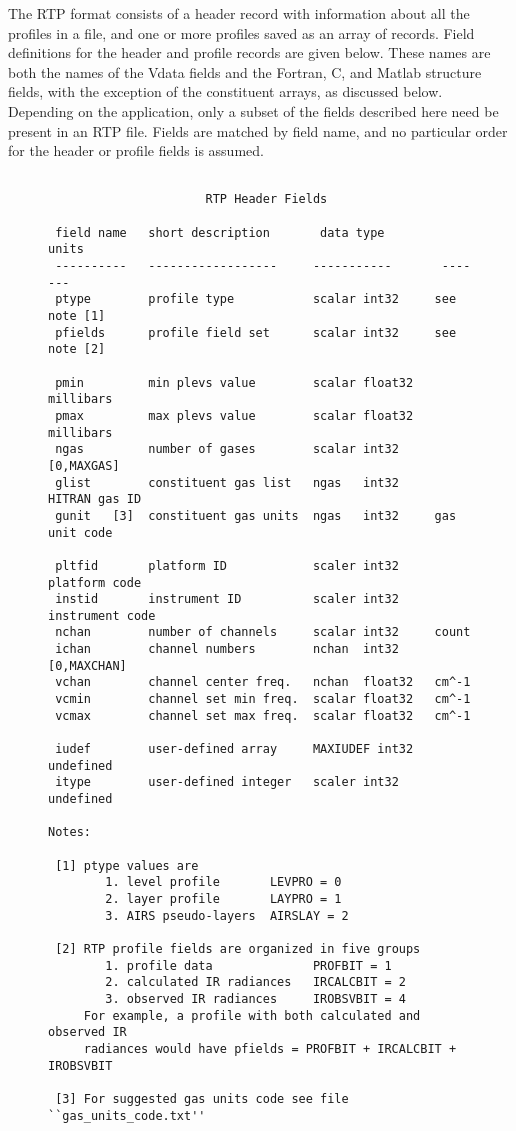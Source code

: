 \documentclass[12pt]{article}
\begin{document}
The RTP format consists of a header record with information about
all the profiles in a file, and one or more profiles saved as an
array of records.  Field definitions for the header and profile
records are given below.  These names are both the names of the
Vdata fields and the Fortran, C, and Matlab structure fields, with
the exception of the constituent arrays, as discussed below.
Depending on the application, only a subset of the fields described
here need be present in an RTP file.  Fields are matched by field
name, and no particular order for the header or profile fields is
assumed.


\begin{figure}
\vskip-14mm
{\small
\begin{verbatim}

                      RTP Header Fields

 field name   short description       data type         units
 ----------   ------------------     -----------       -------
 ptype        profile type           scalar int32     see note [1]
 pfields      profile field set      scalar int32     see note [2]

 pmin         min plevs value        scalar float32   millibars
 pmax         max plevs value        scalar float32   millibars
 ngas         number of gases        scalar int32     [0,MAXGAS]
 glist        constituent gas list   ngas   int32     HITRAN gas ID
 gunit   [3]  constituent gas units  ngas   int32     gas unit code

 pltfid       platform ID            scaler int32     platform code
 instid       instrument ID          scaler int32     instrument code
 nchan        number of channels     scalar int32     count
 ichan        channel numbers        nchan  int32     [0,MAXCHAN]
 vchan        channel center freq.   nchan  float32   cm^-1
 vcmin        channel set min freq.  scalar float32   cm^-1
 vcmax        channel set max freq.  scalar float32   cm^-1

 iudef        user-defined array     MAXIUDEF int32   undefined
 itype        user-defined integer   scaler int32     undefined

Notes:

 [1] ptype values are
        1. level profile       LEVPRO = 0
        2. layer profile       LAYPRO = 1
        3. AIRS pseudo-layers  AIRSLAY = 2

 [2] RTP profile fields are organized in five groups
        1. profile data              PROFBIT = 1
        2. calculated IR radiances   IRCALCBIT = 2
        3. observed IR radiances     IROBSVBIT = 4
     For example, a profile with both calculated and observed IR
     radiances would have pfields = PROFBIT + IRCALCBIT + IROBSVBIT

 [3] For suggested gas units code see file ``gas_units_code.txt''

\end{verbatim}
}
\end{figure}
\end{document}
